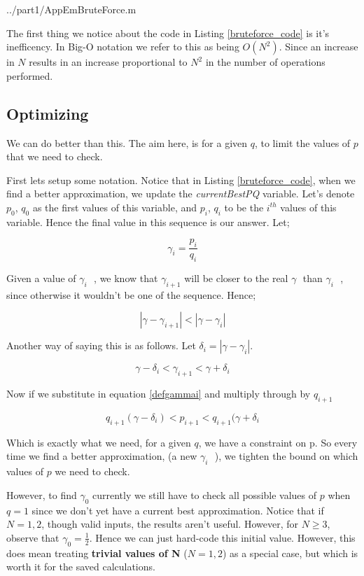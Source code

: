 \documentclass[10pt]{article}
\newcommand*{\gam}{$\gamma \text{ }$}
\newcommand*{\gami}{$\gamma_{i} \text{ }$}
\begin{document}
   {../part1/AppEmBruteForce.m}

The first thing we notice about the code in Listing \ref{bruteforce_code} is it's inefficency. In Big-O notation we refer to this as being $O(N^2)$. Since an increase in $N$ results in an increase proportional to $N^2$ in the number of operations performed.

\subsection{Optimizing}
We can do better than this. The aim here, is for a given $q$, to limit the values of $p$ that we need to check. 

First lets setup some notation. Notice that in Listing \ref{bruteforce_code}, when we find a better approximation, we update the \emph{currentBestPQ} variable. Let's denote $p_0$, $q_0$  as the first values of this variable, and $p_i$, $q_i$ to be the $i^{th}$ values of this variable. Hence the final value in this sequence is our answer. Let;

\begin{equation} \label{defgammai}
  \gamma_i = \frac{p_i}{q_i} 
\end{equation}


Given a value of \gami, we know that $\gamma_{i+1}$ will be closer to the real \gam than \gami, since otherwise it wouldn't be one of the sequence. Hence;

$$ |\gamma- \gamma_{i+1}| < |\gamma - \gamma_{i}| $$

Another way of saying this is as follows. Let $\delta_{i} = | \gamma - \gamma_i  |$. 

$$ \gamma - \delta_i < \gamma_{i+1} < \gamma + \delta_i $$

Now if we substitute in equation \ref{defgammai} and multiply through by $q_{i+1}$

\begin{equation} \label{em_constraint}
q_{i+1} (\gamma - \delta_i) < p_{i+1} < q_{i+1} ( \gamma + \delta_i 
\end{equation} 

Which is exactly what we need, for a given $q$, we have a constraint on p. So every time we find a better approximation, (a new \gami), we tighten the bound on which values of $p$ we need to check.

However, to find $\gamma_0$ currently we still have to check all possible values of $p$ when $q = 1$ since we don't yet have a current best approximation. Notice that if $N = 1,2$, though valid inputs, the results aren't useful. However, for $N \geq 3$, observe that $\gamma_0 = \frac{1}{2}$. Hence we can just hard-code this initial value. However, this does mean treating \textbf{trivial values of N} ($N = 1,2$) as a special case, but which is worth it for the saved calculations.
\end{document}

